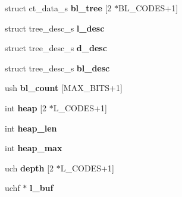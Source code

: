\begin{DoxyCompactItemize}
\item 
\hypertarget{structdeflate__state_a01aeba5885505267be5114c6d7daa2b8}{struct ct\-\_\-data\-\_\-s {\bfseries bl\-\_\-tree} \mbox{[}2 $\ast$B\-L\-\_\-\-C\-O\-D\-E\-S+1\mbox{]}}\label{d3/df8/structdeflate__state_a01aeba5885505267be5114c6d7daa2b8}

\item 
\hypertarget{structdeflate__state_a7071ae3ab12b7ba9d26f62841383c5b7}{struct tree\-\_\-desc\-\_\-s {\bfseries l\-\_\-desc}}\label{d3/df8/structdeflate__state_a7071ae3ab12b7ba9d26f62841383c5b7}

\item 
\hypertarget{structdeflate__state_a40eecfedbeac63db21b713099b1f04dc}{struct tree\-\_\-desc\-\_\-s {\bfseries d\-\_\-desc}}\label{d3/df8/structdeflate__state_a40eecfedbeac63db21b713099b1f04dc}

\item 
\hypertarget{structdeflate__state_a3fb03d757675940e13a737d52654e600}{struct tree\-\_\-desc\-\_\-s {\bfseries bl\-\_\-desc}}\label{d3/df8/structdeflate__state_a3fb03d757675940e13a737d52654e600}

\item 
\hypertarget{structdeflate__state_ab034ed2e06424639e3c74925221ffdd2}{ush {\bfseries bl\-\_\-count} \mbox{[}M\-A\-X\-\_\-\-B\-I\-T\-S+1\mbox{]}}\label{d3/df8/structdeflate__state_ab034ed2e06424639e3c74925221ffdd2}

\item 
\hypertarget{structdeflate__state_a66c4b4a580eed9065cebb6366db1ae7e}{int {\bfseries heap} \mbox{[}2 $\ast$L\-\_\-\-C\-O\-D\-E\-S+1\mbox{]}}\label{d3/df8/structdeflate__state_a66c4b4a580eed9065cebb6366db1ae7e}

\item 
\hypertarget{structdeflate__state_a23b27417664fb5827a914d6a81031fa8}{int {\bfseries heap\-\_\-len}}\label{d3/df8/structdeflate__state_a23b27417664fb5827a914d6a81031fa8}

\item 
\hypertarget{structdeflate__state_abd599bb08b20d60bfaa965fd9d93c7ca}{int {\bfseries heap\-\_\-max}}\label{d3/df8/structdeflate__state_abd599bb08b20d60bfaa965fd9d93c7ca}

\item 
\hypertarget{structdeflate__state_a63b50bd2140b4315ad43e77503571fd5}{uch {\bfseries depth} \mbox{[}2 $\ast$L\-\_\-\-C\-O\-D\-E\-S+1\mbox{]}}\label{d3/df8/structdeflate__state_a63b50bd2140b4315ad43e77503571fd5}

\item 
\hypertarget{structdeflate__state_a1532c80f00d561d8b79c48fa4101c9ad}{uchf $\ast$ {\bfseries l\-\_\-buf}}\label{d3/df8/structdeflate__state_a1532c80f00d561d8b79c48fa4101c9ad}


\end{DoxyCompactItemize}

